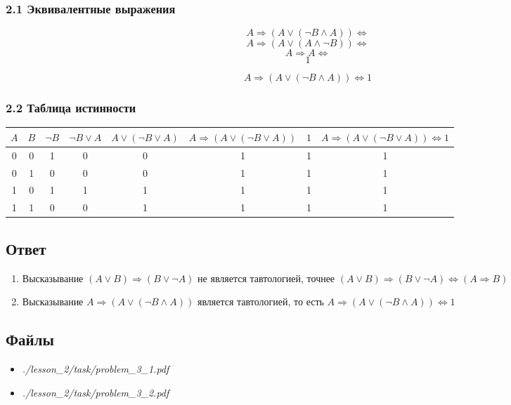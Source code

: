 \subsubsection*{2.1 Эквивалентные выражения}

\[A \Rightarrow (A \vee (\neg B \wedge A)) \Leftrightarrow\]
\[A \Rightarrow (A \vee (A \wedge \neg B)) \Leftrightarrow\]
\[A \Rightarrow A \Leftrightarrow\]
\[1\]

\[A \Rightarrow (A \vee (\neg B \wedge A)) \Leftrightarrow 1\]

\subsubsection*{2.2 Таблица истинности}

\begin{center}
  \begin{tabular}{c c | c c  c c| c | c}
     \(A\) &
     \(B\) &
     \(\neg B\) &
     \(\neg B \vee A\) &
     \(A \vee (\neg B \vee A)\) &
     \(A \Rightarrow (A \vee (\neg B \vee A))\) &
     \(1\)&
     \(A \Rightarrow (A \vee (\neg B \vee A)) \Leftrightarrow 1\) \\
     \hline
     0 & 0 & 1 & 0 & 0 & 1 & 1 & 1 \\
     0 & 1 & 0 & 0 & 0 & 1 & 1 & 1 \\
     1 & 0 & 1 & 1 & 1 & 1 & 1 & 1 \\
     1 & 1 & 0 & 0 & 1 & 1 & 1 & 1
  \end{tabular}
\end{center}

\subsection*{Ответ}

\begin{enumerate}
  \item Высказывание
  \((A \vee B) \Rightarrow (B \vee \neg A)\)
  не является тавтологией, точнее
  \((A \vee B) \Rightarrow (B \vee \neg A) \Leftrightarrow (A \Rightarrow B)\)
  \item Высказывание
  \(A \Rightarrow  (A \vee (\neg B \wedge A))\)
  является тавтологией, то есть
  \(A \Rightarrow  (A \vee (\neg B \wedge A)) \Leftrightarrow 1\)
\end{enumerate}

\subsection*{Файлы}

\begin{itemize}
  \item \textit{./lesson\_2/task/problem\_3\_1.pdf}
  \item \textit{./lesson\_2/task/problem\_3\_2.pdf}
\end{itemize}
